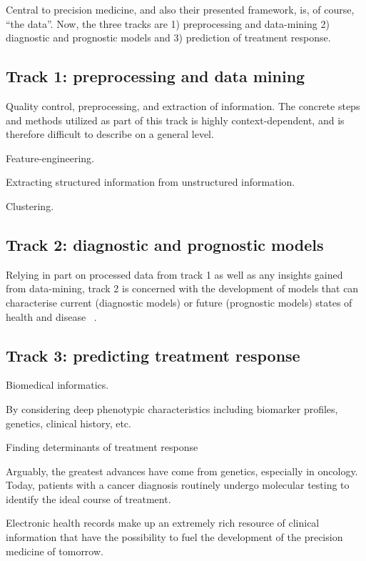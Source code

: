 Central to precision medicine, and also their presented framework,
is, of course, \enquote{the data}. 
Now, the three tracks are
1) preprocessing and data-mining
2) diagnostic and prognostic models
and 3) prediction of treatment response.





\subsection{Track 1: preprocessing and data mining}

Quality control, preprocessing, and extraction of information.
The concrete steps and methods utilized as part of this track
is highly context-dependent, 
and is therefore difficult to describe on a general level. 

Feature-engineering.

Extracting structured information from unstructured information.

Clustering.

\subsection{Track 2: diagnostic and prognostic models}

Relying in part on processed data from track 1
as well as any insights gained from data-mining,
track 2 is concerned with the development
of models that can characterise current (diagnostic models)
or future (prognostic models) states of health and disease~%
\autocite{konigWhat2017}. 

\subsection{Track 3: predicting treatment response}

Biomedical informatics.

By considering deep phenotypic characteristics including 
biomarker profiles, genetics, clinical history, etc. 

Finding determinants of treatment response

Arguably, the greatest advances have come from genetics, especially in oncology.
Today, patients with a cancer diagnosis routinely undergo molecular testing
to identify the ideal course of treatment.

Electronic health records make up an extremely rich resource of clinical
information that have the possibility to fuel the development of the 
precision medicine of tomorrow.







